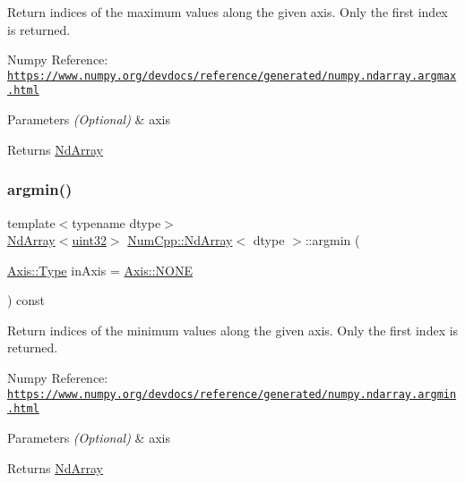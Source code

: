 Return indices of the maximum values along the given axis. Only the first index is returned.

Numpy Reference\+: \href{https://www.numpy.org/devdocs/reference/generated/numpy.ndarray.argmax.html}{\tt https\+://www.\+numpy.\+org/devdocs/reference/generated/numpy.\+ndarray.\+argmax.\+html}


\begin{DoxyParams}{Parameters}
{\em (\+Optional)} & axis \\
\hline
\end{DoxyParams}
\begin{DoxyReturn}{Returns}
\mbox{\hyperlink{class_num_cpp_1_1_nd_array}{Nd\+Array}} 
\end{DoxyReturn}
\mbox{\label{class_num_cpp_1_1_nd_array_abe930fb3d8bed8863bf4611d3ce0f2f9}} 
\subsubsection{\texorpdfstring{argmin()}{argmin()}}
{\footnotesize\ttfamily template$<$typename dtype$>$ \\
\mbox{\hyperlink{class_num_cpp_1_1_nd_array}{Nd\+Array}}$<$\mbox{\hyperlink{namespace_num_cpp_a36f388e948380413c63011cab9b7fbd5}{uint32}}$>$ \mbox{\hyperlink{class_num_cpp_1_1_nd_array}{Num\+Cpp\+::\+Nd\+Array}}$<$ dtype $>$\+::argmin (\begin{DoxyParamCaption}\item[{\mbox{\hyperlink{struct_num_cpp_1_1_axis_ac10eb76f8631762d9ed70c40c42ca6cb}{Axis\+::\+Type}}}]{in\+Axis = {\ttfamily \mbox{\hyperlink{struct_num_cpp_1_1_axis_ac10eb76f8631762d9ed70c40c42ca6cba747ae657022cca1d87702b56d0c038e9}{Axis\+::\+N\+O\+NE}}} }\end{DoxyParamCaption}) const\hspace{0.3cm}{\ttfamily [inline]}}

Return indices of the minimum values along the given axis. Only the first index is returned.

Numpy Reference\+: \href{https://www.numpy.org/devdocs/reference/generated/numpy.ndarray.argmin.html}{\tt https\+://www.\+numpy.\+org/devdocs/reference/generated/numpy.\+ndarray.\+argmin.\+html}


\begin{DoxyParams}{Parameters}
{\em (\+Optional)} & axis \\
\hline
\end{DoxyParams}
\begin{DoxyReturn}{Returns}
\mbox{\hyperlink{class_num_cpp_1_1_nd_array}{Nd\+Array}} 
\end{DoxyReturn}
\mbox{\label{class_num_cpp_1_1_nd_array_a620f06df9c6be4a381501487c23cac64}} 
